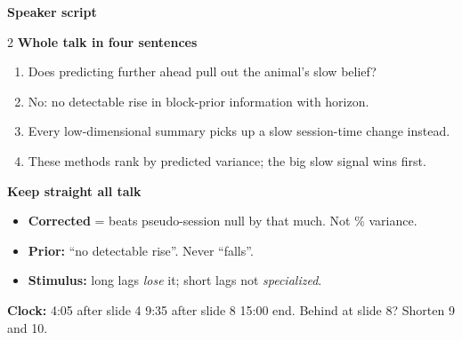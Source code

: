 \documentclass[10pt]{article}
\begin{document}
{\large\bfseries\color{teal} Speaker script}

\begin{tcolorbox}[colback=accent!6, colframe=accent!40, arc=2pt, boxrule=0.5pt, left=5pt, right=5pt, top=2pt, bottom=2pt]
\begin{multicols}{2}
\textbf{Whole talk in four sentences}
\begin{enumerate}[leftmargin=1.3em, itemsep=0pt, topsep=1pt]
\item Does predicting further ahead pull out the animal's slow belief?
\item No: no detectable rise in block-prior information with horizon.
\item Every low-dimensional summary picks up a slow session-time change instead.
\item These methods rank by predicted variance; the big slow signal wins first.
\end{enumerate}
\columnbreak
\textbf{Keep straight all talk}
\begin{itemize}
\item \textbf{Corrected} = beats pseudo-session null by that much. Not \% variance.
\item \textbf{Prior:} ``no detectable rise''. Never ``falls''.
\item \textbf{Stimulus:} long lags \emph{lose} it; short lags not \emph{specialized}.
\end{itemize}
\textbf{Clock:} 4:05 after slide 4 \textperiodcentered{} 9:35 after slide 8 \textperiodcentered{} 15:00 end. Behind
at slide 8? Shorten 9 and 10.
\end{multicols}
\end{tcolorbox}
\end{document}
